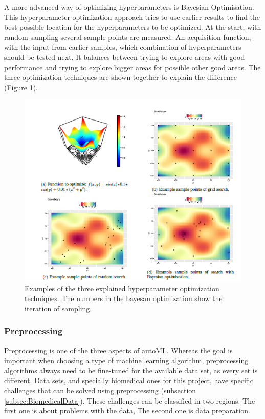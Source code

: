 \documentclass[10pt,a4paper]{article}
\begin{document}
	A more advanced way of optimizing hyperparameters is Bayesian Optimisation. This hyperparameter optimization approach tries to use earlier results to find the best possible location for the hyperparameters to be optimized. At the start, with random sampling several sample points are measured. An acquisition function, with the input from earlier samples, which combination of hyperparameters should be tested next. It balances between trying to explore areas with good performance and trying to explore bigger areas for possible other good areas. \cite{snoek2012practical} The three optimization techniques are shown together to explain the difference (Figure \ref{fig:HyperparameterOptimization}).
	
	\begin{figure}
		\label{fig:HyperparameterOptimization}
		\includegraphics[scale=0.8]{HyperparameterOptimization.png}
		\caption{Examples of the three explained hyperparameter optimization techniques. The numbers in the bayesan optimization show the iteration of sampling. \cite{Gijsbers2017Thesis}}
	\end{figure}
	
	\subsubsection{Preprocessing}
	\label{subsubsec:Preprocessing}
	
 	Preprocessing is one of the three aspects of autoML. Whereas the goal is important when choosing a type of machine learning algorithm, preprocessing algorithms always need to be fine-tuned for the available data set, as every set is different. Data sets, and specially biomedical ones for this project, have specific challenges that can be solved using preprocessing (subsection \ref{subsec:BiomedicalData}). These challenges can be classified in two regions. The first one is about problems with the data, The second one is data preparation. \cite{famili1997data}
 	
\end{document}
